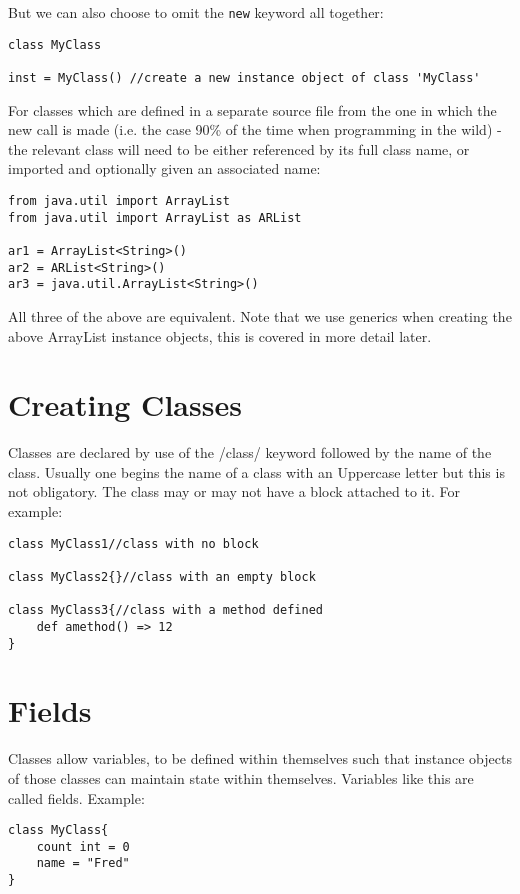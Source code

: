 \documentclass[conc-doc]{subfiles}
\begin{document}
But we can also choose to omit the \lstinline{new} keyword all together:

\begin{lstlisting}
class MyClass

inst = MyClass() //create a new instance object of class 'MyClass'
\end{lstlisting}

For classes which are defined in a separate source file from the one in which the new call is made (i.e. the case 90\% of the time when programming in the wild) - the relevant class will need to be either referenced by its full class name, or imported and optionally given an associated name:

\begin{lstlisting}
from java.util import ArrayList
from java.util import ArrayList as ARList

ar1 = ArrayList<String>()
ar2 = ARList<String>()
ar3 = java.util.ArrayList<String>()
\end{lstlisting}

All three of the above are equivalent. Note that we use generics when creating the above ArrayList instance objects, this is covered in more detail later.

\section{Creating Classes}
Classes are declared by use of the /class/ keyword followed by the name of the class. Usually one begins the name of a class with an Uppercase letter but this is not obligatory. The class may or may not have a block attached to it. For example:

\begin{lstlisting}
class MyClass1//class with no block

class MyClass2{}//class with an empty block

class MyClass3{//class with a method defined
	def amethod() => 12
}
\end{lstlisting}

\section{Fields}
Classes allow variables, to be defined within themselves such that instance objects of those classes can maintain state within themselves. Variables like this are called fields. Example:

\begin{lstlisting}
class MyClass{
	count int = 0
	name = "Fred"
}
\end{lstlisting}
\end{document}
